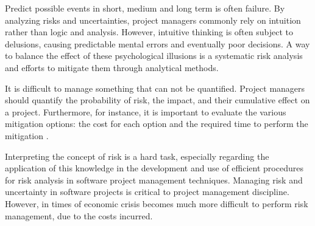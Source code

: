 Predict possible events in short, medium and long term is often failure. By analyzing risks and uncertainties, project managers commonly rely on intuition rather than logic and analysis. However, intuitive thinking is often subject to delusions, causing predictable mental errors and eventually poor decisions. A way to balance the effect of these psychological illusions is a systematic risk analysis and efforts to mitigate them through analytical methods. 

It is difficult to manage something that can not be quantified. Project managers should quantify the probability of risk, the impact, and their cumulative effect on a project. Furthermore, for instance, it is important to evaluate the various mitigation options: the cost for each option and the required time to perform the mitigation \cite{VIRINE2009}. 

Interpreting the concept of risk is a hard task, especially regarding the application of this knowledge in the development and use of efficient procedures for risk analysis in software project management techniques. Managing risk and uncertainty in software projects is critical to project management discipline. However, in times of economic crisis becomes much more difficult to perform risk management, due to the costs incurred.


